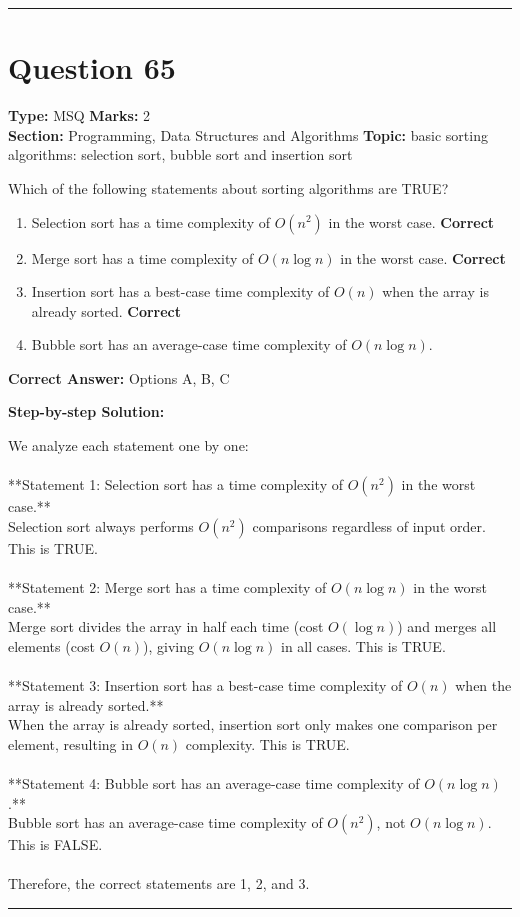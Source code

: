 \documentclass[11pt]{article}
\begin{document}
\vspace{0.8em}
\hrule
\vspace{0.4em}
\section*{Question 65}
\textbf{Type:} MSQ \hfill \textbf{Marks:} 2\\
\textbf{Section:} Programming, Data Structures and Algorithms \hfill \textbf{Topic:} basic sorting algorithms: selection sort, bubble sort and insertion sort

Which of the following statements about sorting algorithms are TRUE?


\begin{enumerate}[label=\textbf{\Alph*.}, leftmargin=1.8em]
\item Selection sort has a time complexity of \(O(n^2)\) in the worst case. \hfill {\color{gategreen}\textbf{Correct}}\item Merge sort has a time complexity of \(O(n \log n)\) in the worst case. \hfill {\color{gategreen}\textbf{Correct}}\item Insertion sort has a best-case time complexity of \(O(n)\) when the array is already sorted. \hfill {\color{gategreen}\textbf{Correct}}\item Bubble sort has an average-case time complexity of \(O(n \log n)\).\end{enumerate}

\textbf{Correct Answer:} Options A, B, C

\textbf{Step-by-step Solution:}

We analyze each statement one by one:\\
\\
**Statement 1: Selection sort has a time complexity of \(O(n^2)\) in the worst case.**\\
Selection sort always performs \(O(n^2)\) comparisons regardless of input order. This is TRUE.\\
\\
**Statement 2: Merge sort has a time complexity of \(O(n \log n)\) in the worst case.**\\
Merge sort divides the array in half each time (cost \(O(\log n)\)) and merges all elements (cost \(O(n)\)), giving \(O(n \log n)\) in all cases. This is TRUE.\\
\\
**Statement 3: Insertion sort has a best-case time complexity of \(O(n)\) when the array is already sorted.**\\
When the array is already sorted, insertion sort only makes one comparison per element, resulting in \(O(n)\) complexity. This is TRUE.\\
\\
**Statement 4: Bubble sort has an average-case time complexity of \(O(n \log n)\).**\\
Bubble sort has an average-case time complexity of \(O(n^2)\), not \(O(n \log n)\). This is FALSE.\\
\\
Therefore, the correct statements are 1, 2, and 3.

\vspace{0.8em}
\hrule
\vspace{0.4em}
\end{document}
